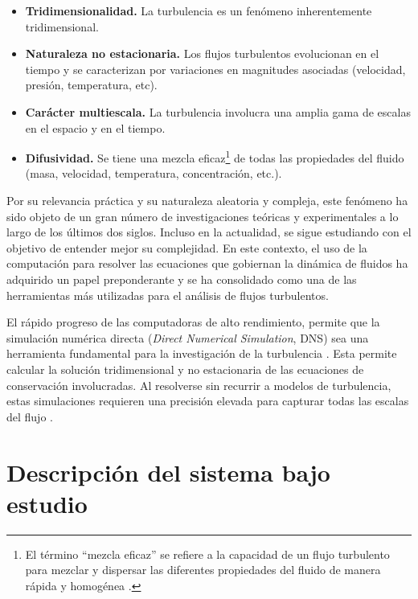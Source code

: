 \begin{itemize}
	
	\item \textbf{Tridimensionalidad.} La turbulencia es un fenómeno inherentemente tridimensional. 
	
	\item \textbf{Naturaleza no estacionaria.} Los flujos turbulentos evolucionan en el tiempo y se caracterizan por variaciones en magnitudes asociadas (velocidad, presión, temperatura, etc).
	
	\item \textbf{Carácter multiescala.} La turbulencia involucra una amplia gama de escalas en el espacio y en el tiempo. 
	
	\item \textbf{Difusividad.} Se tiene una mezcla eficaz\footnote{El término ``mezcla eficaz'' se refiere a la capacidad de un flujo turbulento para mezclar y dispersar las diferentes propiedades del fluido de manera rápida y homogénea \cite{pope2001turbulent}.} de todas las propiedades del fluido (masa, velocidad, temperatura, concentración, etc.).

\end{itemize}

Por su relevancia práctica y su naturaleza aleatoria y compleja, este fenómeno ha sido objeto de un gran número de investigaciones teóricas y experimentales a lo largo de los últimos dos siglos. Incluso en la actualidad, se sigue estudiando con el objetivo de entender mejor su complejidad. En este contexto, el uso de la computación para resolver las ecuaciones que gobiernan la dinámica de fluidos ha adquirido un papel preponderante y se ha consolidado como una de las herramientas más utilizadas para el análisis de flujos turbulentos.

El rápido progreso de las computadoras de alto rendimiento, permite que la simulación numérica directa (\textit{Direct Numerical Simulation}, DNS) sea una herramienta fundamental para la investigación de la turbulencia \cite{moin1998direct}. Esta permite calcular la solución tridimensional y no estacionaria de las ecuaciones de conservación involucradas. Al resolverse sin recurrir a modelos de turbulencia, estas simulaciones requieren una precisión elevada para capturar todas las escalas del flujo \cite{pope2001turbulent}.

\section{Descripción del sistema bajo estudio}%

